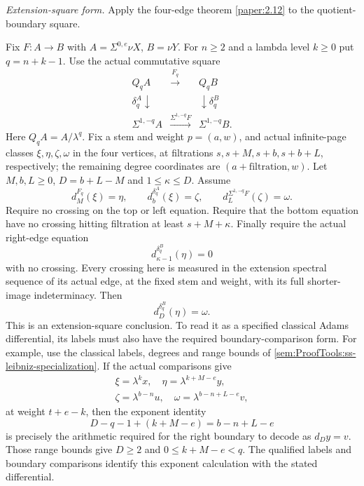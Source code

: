 \begin{proposition}
\label{sem:ProofTools:ss-cutoff-square-specialization}
\label{paper:6.5}
\label{sem:ProofTools:ss-adams-soundness}

\textit{Extension-square form.}
Apply the four-edge theorem \ref{paper:2.12} to the quotient-boundary square.

Fix $F:A\to B$ with $A=\Sigma^{0,e}\nu X$, $B=\nu Y$. For
$n\ge2$ and a lambda level $k\ge0$ put $q=n+k-1$. Use the actual
commutative square
\[
\begin{array}{ccc}
Q_qA&\xrightarrow{F_q}&Q_qB\\
\delta_q^A\downarrow&&\downarrow\delta_q^B\\
\Sigma^{1,-q}A&\xrightarrow{\Sigma^{1,-q}F}&\Sigma^{1,-q}B.
\end{array}
\]
Here $Q_qA=A/\lambda^q$. Fix a stem and weight $p=(a,w)$, and actual
infinite-page classes $\xi,\eta,\zeta,\omega$ in the four vertices,
at filtrations $s,s+M,s+b,s+b+L$, respectively; the remaining degree
coordinates are $(a+\mathrm{filtration},w)$.
Let $M,b,L\ge0$, $D=b+L-M$ and $1\le\kappa\le D$.
Assume
\[
d_M^{F_q}(\xi)=\eta,\qquad
d_b^{\delta_q^A}(\xi)=\zeta,\qquad
d_L^{\Sigma^{1,-q}F}(\zeta)=\omega.
\]
Require no crossing on the top or left equation. Require that the
bottom equation have no crossing hitting filtration at least
$s+M+\kappa$. Finally require the actual right-edge equation
\[
d_{\kappa-1}^{\delta_q^B}(\eta)=0
\]
with no crossing. Every crossing here is measured in the extension
spectral sequence of its actual edge, at the fixed stem and weight,
with its full shorter-image indeterminacy. Then
\[
d_D^{\delta_q^B}(\eta)=\omega.
\]
This is an extension-square conclusion. To read it as a specified
classical Adams differential, its labels must also have the required
boundary-comparison form. For example, use the classical labels,
degrees and range bounds of \ref{sem:ProofTools:ss-leibniz-specialization}.
If the actual comparisons give
\[
\begin{gathered}
\xi=\lambda^k x,\quad
\eta=\lambda^{k+M-e}y,\\
\zeta=\lambda^{b-n}u,\quad
\omega=\lambda^{b-n+L-e}v,
\end{gathered}
\]
at weight $t+e-k$, then the exponent identity
\[
D-q-1+(k+M-e)=b-n+L-e
\]
is precisely the arithmetic required for the right boundary to decode
as $d_Dy=v$. Those range bounds give $D\ge2$ and
$0\le k+M-e<q$. The qualified labels and boundary comparisons identify this exponent
calculation with the stated differential.


\end{proposition}
